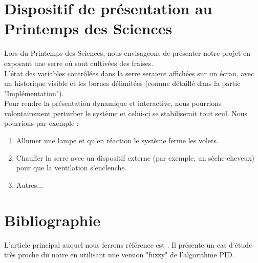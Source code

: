 \documentclass[a4paper,10pt]{article}
\begin{document}
\newpage

\vspace{-2cm}


\newpage

\section{Dispositif de présentation au Printemps des Sciences}

Lors du Printemps des Sciences, nous envisageons de présenter notre projet en exposant une serre où sont cultivées des fraises. \\

L'état des variables contrôlées dans la serre seraient affichées sur un écran, avec un historique visible et les bornes délimitées (comme détaillé dans la partie "Implémentation"). \\

Pour rendre la présentation dynamique et interactive, nous pourrions volontairement perturber le système et celui-ci se stabiliserait tout seul. Nous pourrions par exemple :
\begin{enumerate}
	\item Allumer une lampe et qu'en réaction le système ferme les volets.
	\item Chauffer la serre avec un dispositif externe (par exemple, un sèche-cheveux) pour que la ventilation s'enclenche.
	\item Autres... \\
\end{enumerate}

\section{Bibliographie}

L'article principal auquel nous ferrons référence est \cite{Zheying2014}. Il présente un cas d'étude très proche du notre en utilisant une version "fuzzy" de l'algorithme PID.\\

\newpage

\printbibliography
\end{document}
